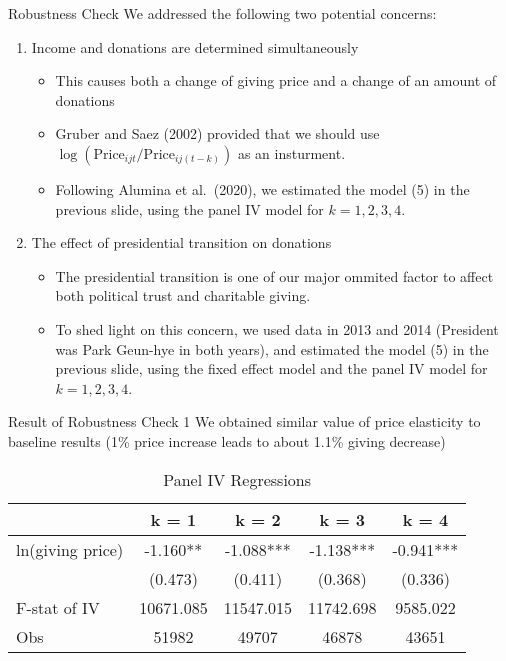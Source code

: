 \documentclass[
  ignorenonframetext,
]{beamer}
\providecommand{\tightlist}{%
  \setlength{\itemsep}{0pt}\setlength{\parskip}{0pt}}
\begin{document}
\begin{frame}{Robustness Check}
\protect\hypertarget{robustness-check}{}
We addressed the following two potential concerns:

\begin{enumerate}
\tightlist
\item
  Income and donations are determined simultaneously

  \begin{itemize}
  \tightlist
  \item
    This causes both a change of giving price and a change of an amount
    of donations
  \item
    Gruber and Saez (2002) provided that we should use
    \(\log(\text{Price}_{ijt}/\text{Price}_{ij(t-k)})\) as an
    insturment.
  \item
    Following Alumina et al.~(2020), we estimated the model (5) in the
    previous slide, using the panel IV model for \(k = 1, 2, 3, 4\).
  \end{itemize}
\item
  The effect of presidential transition on donations

  \begin{itemize}
  \tightlist
  \item
    The presidential transition is one of our major ommited factor to
    affect both political trust and charitable giving.
  \item
    To shed light on this concern, we used data in 2013 and 2014
    (President was Park Geun-hye in both years), and estimated the model
    (5) in the previous slide, using the fixed effect model and the
    panel IV model for \(k = 1, 2, 3, 4\).
  \end{itemize}
\end{enumerate}
\end{frame}

\begin{frame}{Result of Robustness Check 1}
\protect\hypertarget{result-of-robustness-check-1}{}
We obtained similar value of price elasticity to baseline results (1\%
price increase leads to about 1.1\% giving decrease)

\begin{table}

\caption{\label{tab:kableRobust1EstimateElasticity}Panel IV Regressions}
\centering
\begin{tabular}[t]{lcccc}
\toprule
 & k = 1 & k = 2 & k = 3 & k = 4\\
\midrule
ln(giving price) & -1.160** & -1.088*** & -1.138*** & -0.941***\\
 & (0.473) & (0.411) & (0.368) & (0.336)\\
F-stat of IV & 10671.085 & 11547.015 & 11742.698 & 9585.022\\
Obs & 51982 & 49707 & 46878 & 43651\\
\bottomrule
\end{tabular}
\end{table}
\end{frame}
\end{document}

